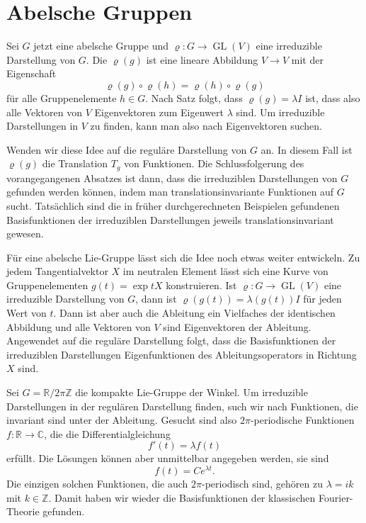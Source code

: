 %
%
%
\section{Abelsche Gruppen
\label{buch:gruppen:section:abelschegruppen}}
Sei $G$ jetzt eine abelsche Gruppe und $\varrho\colon G\to\operatorname{GL}(V)$
eine irreduzible Darstellung von $G$.
Die $\varrho(g)$ ist eine lineare Abbildung $V\to V$ mit der Eigenschaft
\[
\varrho(g)\circ\varrho(h) = \varrho(h)\circ\varrho(g)
\]
für alle Gruppenelemente $h\in G$.
Nach Satz folgt, dass $\varrho(g)=\lambda I$ ist, dass also alle Vektoren
von $V$ Eigenvektoren zum Eigenwert $\lambda$ sind.
Um irreduzible Darstellungen in $V$ zu finden, kann man also nach
Eigenvektoren suchen.

Wenden wir diese Idee auf die reguläre Darstellung von $G$ an.
In diesem Fall ist $\varrho(g)$ die Translation $T_g$ von Funktionen.
Die Schlussfolgerung des vorangegangenen Absatzes ist dann, dass die
irreduziblen Darstellungen von $G$ gefunden werden können, indem man
translationsinvariante Funktionen auf $G$ sucht.
Tatsächlich sind die in früher durchgerechneten Beispielen gefundenen
Basisfunktionen der irreduziblen Darstellungen jeweils translationsinvariant
gewesen.

Für eine abelsche Lie-Gruppe lässt sich die Idee noch etwas weiter
entwickeln.
Zu jedem Tangentialvektor $X$ im neutralen Element lässt sich eine
Kurve von Gruppenelementen $g(t)=\exp tX$ konstruieren.
Ist $\varrho\colon G\to\operatorname{GL}(V)$ eine irreduzible Darstellung
von $G$, dann ist $\varrho(g(t))=\lambda(g(t)) I$ für jeden Wert von $t$.
Dann ist aber auch die Ableitung ein Vielfaches der identischen Abbildung
und alle Vektoren von $V$ sind Eigenvektoren der Ableitung.
Angewendet auf die reguläre Darstellung folgt, dass die Basisfunktionen
der irreduziblen Darstellungen Eigenfunktionen des Ableitungsoperators
in Richtung $X$ sind.

\begin{beispiel}
Sei $G=\mathbb{R}/2\pi\mathbb{Z}$ die kompakte Lie-Gruppe der Winkel.
Um irreduzible Darstellungen in der regulären Darstellung finden, such
wir nach Funktionen, die invariant sind unter der Ableitung.
Gesucht sind also $2\pi$-periodische Funktionen
$f\colon\mathbb{R}\to\mathbb{C}$, die die Differentialgleichung
\[
f'(t) =\lambda f(t)
\]
erfüllt.
Die Lösungen können aber unmittelbar angegeben werden, sie sind
\[
f(t) = Ce^{\lambda t}.
\]
Die einzigen solchen Funktionen, die auch $2\pi$-periodisch sind, 
gehören zu $\lambda = ik$ mit $k\in \mathbb{Z}$.
Damit haben wir wieder die Basisfunktionen der klassischen Fourier-Theorie
gefunden.
\end{beispiel}


